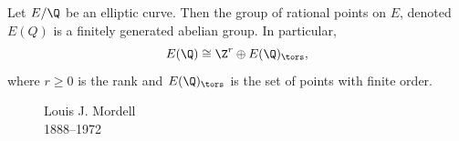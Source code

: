 \begin{frame}[plain]
	\begin{thm}[Mordell, 1922]
	Let $E/\Q$ be an elliptic curve. Then the group of rational points on $E$, denoted $E(Q)$ is a finitely generated abelian group. In particular, 
		\[
		E(\Q) \cong \Z^r \oplus E(\Q)_\tors,
		\]
	where $r \geq 0$ is the rank and $E(\Q)_\tors$ is the set of points with finite order. 
	\end{thm}
	\begin{figure}[h]
	\captionsetup{labelformat=empty}
	\centering
	\caption{Louis J. Mordell \\ 1888--1972}
	\end{figure}
\end{frame}


